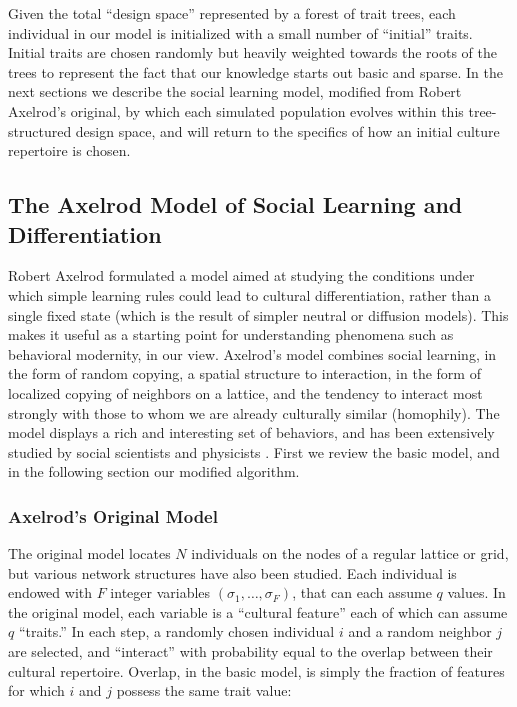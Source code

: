 \documentclass[graybox,natbib]{svmult}
\begin{document}
Given the total ``design space'' represented by a forest of trait trees,
each individual in our model is initialized with a small number of
``initial'' traits. Initial traits are chosen randomly but heavily
weighted towards the roots of the trees to represent the fact that our
knowledge starts out basic and sparse. In the next sections we describe
the social learning model, modified from Robert Axelrod's original, by
which each simulated population evolves within this tree-structured
design space, and will return to the specifics of how an initial culture
repertoire is chosen.

\subsection{The Axelrod Model of Social Learning and
Differentiation}\label{the-axelrod-model-of-social-learning-and-differentiation}

Robert Axelrod \citeyearpar{axelrod1997} formulated a model aimed at
studying the conditions under which simple learning rules could lead to
cultural differentiation, rather than a single fixed state (which is the
result of simpler neutral or diffusion models). This makes it useful as
a starting point for understanding phenomena such as behavioral
modernity, in our view. Axelrod's model combines social learning, in the
form of random copying, a spatial structure to interaction, in the form
of localized copying of neighbors on a lattice, and the tendency to
interact most strongly with those to whom we are already culturally
similar (homophily). The model displays a rich and interesting set of
behaviors, and has been extensively studied by social scientists and
physicists \citep{castellano2009statistical}. First we review the basic
model, and in the following section our modified algorithm.

\subsubsection{Axelrod's Original Model}\label{axelrods-original-model}

The original model locates $N$ individuals on the nodes of a regular
lattice or grid, but various network structures have also been studied.
Each individual is endowed with $F$ integer variables
$(\sigma_1,\ldots,\sigma_F)$, that can each assume $q$ values. In the
original model, each variable is a ``cultural feature'' each of which
can assume $q$ ``traits.'' In each step, a randomly chosen individual
$i$ and a random neighbor $j$ are selected, and ``interact'' with
probability equal to the overlap between their cultural repertoire.
Overlap, in the basic model, is simply the fraction of features for
which $i$ and $j$ possess the same trait value:
\end{document}
